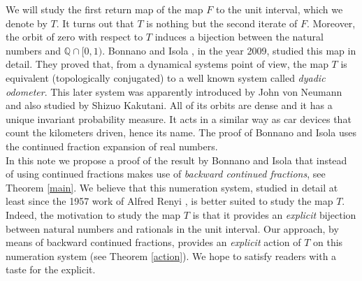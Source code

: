 \documentclass[letterpaper,10pt,reqno]{amsart}
\numberwithin{equation}{section}     %
\def\Q{{\mathbb Q}}
\begin{document}
We will study the first return map of the map $F$ to the unit interval, which we denote by $T$. It turns out that $T$ is nothing but the second iterate of $F$. Moreover, the orbit of zero with respect to $T$ induces a bijection between the natural numbers and $\Q \cap [0,1)$. Bonnano and Isola \cite{bi}, {{}{in}} the year 2009, studied this map in detail. They proved that, from a dynamical systems point of view, the map $T$ is equivalent (topologically conjugated) to a well known system called \emph{dyadic odometer}. This later system was apparently introduced by John von Neumann and also studied by Shizuo 
 Kakutani. All of its orbits are dense and it has a unique invariant probability measure. It acts in a similar way as car devices that count the kilometers driven, hence its name. The proof of Bonnano and Isola uses the continued fraction expansion of real numbers. \\


In this note we propose a proof of the result by Bonnano and Isola that instead of using continued fractions makes use of \emph{backward continued fractions}, see Theorem \ref{main}.  We believe that this numeration system, studied in detail at least since the 1957 work of Alfred Renyi \cite{re},  is better suited to study the map $T$. Indeed, the motivation to  study the map $T$ is that it provides an \emph{explicit} bijection between natural numbers and rationals in the unit interval. Our approach, by means of backward continued fractions, provides an \emph{explicit} action of $T$ on this numeration system (see Theorem \ref{action}).  We hope to satisfy readers with a taste for the explicit.\\
\end{document}
